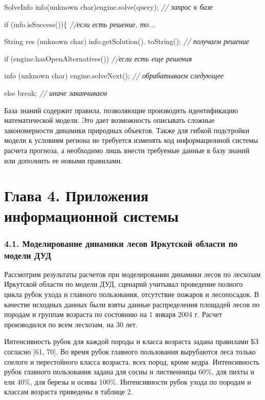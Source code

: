 \documentclass{article}
\begin{document}
SolveInfo info(unknown char)engine.solve(query);     \textit{// запрос к 
базе}

if (info.isSuccess())\{        \textit{//если есть решение, то... 
 }

String res (unknown char) info.getSolution(). toString();    \textit{// получаем 
решение  }

if (engine.hasOpenAlternatives())    \textit{//если есть еще решения 
   }

info (unknown char) engine.solveNext();      \textit{// обрабатываем 
следующее}

else break;    \textit{// иначе заканчиваем}

База знаний содержит правила, позволяющие производить 
идентификацию математической модели. Это дает 
возможность описывать сложные закономерности 
динамики природных объектов. Также для гибкой 
подстройки модели к условиям региона не требуется 
изменять код информационной системы расчета 
прогноза, а необходимо лишь внести требуемые 
данные в базу знаний или дополнить ее новыми 
правилами. \pagebreak{}\label{HToc199746740}

\section*{\textbf{Глава 4. Приложения информационной 
системы\label{HToc199746741}}}

\subsubsection*{\textbf{4.1. Моделирование динамики лесов 
Иркутской области по модели ДУД}}

Рассмотрим результаты расчетов при моделировании 
динамики лесов по лесхозам Иркутской области 
по модели ДУД, сценарий учитывал проведение 
полного цикла рубок ухода и главного пользования, 
отсутствие пожаров и лесопосадок. В качестве 
исходных данных были взяты данные распределения 
площадей лесов по породам и группам возраста 
по состоянию на 1 января 2004 г. Расчет производился 
по всем лесхозам, на 30 лет.

Интенсивность рубок для каждой породы и класса 
возраста задана правилами БЗ согласно [61, 70]. 
Во время рубок главного пользования вырубаются 
леса только спелого и перестойного класса возраста, 
всех пород, кроме кедра. Интенсивность рубок 
главного пользования задана для сосны и лиственницы 
60\%, для пихты и ели 40\%, для березы и осины 100\%. 
Интенсивности рубок ухода по породам и классам 
возраста приведены в таблице 2.
\end{document}
